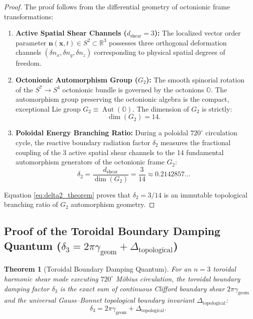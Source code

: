 \documentclass[11pt,a4paper]{article}
\newtheorem{thm}{Theorem}
\begin{document}
	\begin{proof}
		The proof follows from the differential geometry of octonionic frame transformations:
		\begin{enumerate}
			\item \textbf{Active Spatial Shear Channels ($d_{\text{shear}} = 3$):} The localized vector order parameter $\mathbf{n}(\mathbf{x}, t) \in S^2 \subset \mathbb{R}^3$ possesses three orthogonal deformation channels $(\delta n_x, \delta n_y, \delta n_z)$ corresponding to physical spatial degrees of freedom.
			\item \textbf{Octonionic Automorphism Group ($G_2$):} The smooth spinorial rotation of the $S^7 \to S^4$ octonionic bundle is governed by the octonions $\mathbb{O}$. The automorphism group preserving the octonionic algebra is the compact, exceptional Lie group $G_2 \equiv \operatorname{Aut}(\mathbb{O})$. The dimension of $G_2$ is strictly:
			\begin{equation}
				\dim(G_2) = 14.
			\end{equation}
			\item \textbf{Poloidal Energy Branching Ratio:} During a poloidal $720^\circ$ circulation cycle, the reactive boundary radiation factor $\delta_2$ measures the fractional coupling of the 3 active spatial shear channels to the 14 fundamental automorphism generators of the octonionic frame $G_2$:
			\begin{equation}
				\delta_2 = \frac{d_{\text{shear}}}{\dim(G_2)} = \frac{3}{14} \approx 0.2142857\dots
			\end{equation}
		\end{enumerate}
		Equation \eqref{eq:delta2_theorem} proves that $\delta_2 = 3/14$ is an immutable topological branching ratio of $G_2$ automorphism geometry.
	\end{proof}
	
	\subsection{Proof of the Toroidal Boundary Damping Quantum (\texorpdfstring{$\delta_3 = 2\pi\gamma_{\text{geom}} + \Delta_{\text{topological}}$}{delta_3 = 2pi gamma_geom + Delta_topological})}
	\label{app:tau_delta3_proof}
	
	\begin{thm}[Toroidal Boundary Damping Quantum]
		\label{thm:delta3_toroidal}
		For an $n=3$ toroidal harmonic shear mode executing $720^\circ$ Möbius circulation, the toroidal boundary damping factor $\delta_3$ is the exact sum of continuous Clifford boundary shear $2\pi \gamma_{\text{geom}}$ and the universal Gauss--Bonnet topological boundary invariant $\Delta_{\text{topological}}$:
		\begin{equation}
			\delta_3 = 2\pi \gamma_{\text{geom}} + \Delta_{\text{topological}}.
			\label{eq:delta3_symbolic_theorem}
		\end{equation}
	\end{thm}
	
\end{document}
